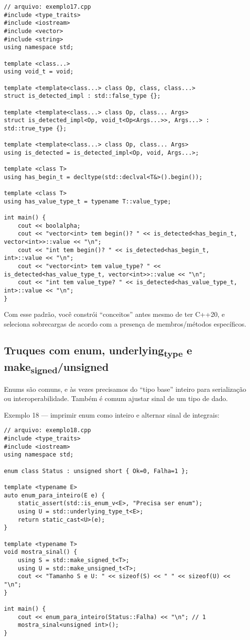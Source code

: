 \documentclass[11pt]{article}
\begin{document}
\begin{verbatim}
// arquivo: exemplo17.cpp
#include <type_traits>
#include <iostream>
#include <vector>
#include <string>
using namespace std;

template <class...>
using void_t = void;

template <template<class...> class Op, class, class...>
struct is_detected_impl : std::false_type {};

template <template<class...> class Op, class... Args>
struct is_detected_impl<Op, void_t<Op<Args...>>, Args...> : std::true_type {};

template <template<class...> class Op, class... Args>
using is_detected = is_detected_impl<Op, void, Args...>;

template <class T>
using has_begin_t = decltype(std::declval<T&>().begin());

template <class T>
using has_value_type_t = typename T::value_type;

int main() {
    cout << boolalpha;
    cout << "vector<int> tem begin()? " << is_detected<has_begin_t, vector<int>>::value << "\n";
    cout << "int tem begin()? " << is_detected<has_begin_t, int>::value << "\n";
    cout << "vector<int> tem value_type? " << is_detected<has_value_type_t, vector<int>>::value << "\n";
    cout << "int tem value_type? " << is_detected<has_value_type_t, int>::value << "\n";
}
\end{verbatim}

Com esse padrão, você constrói “conceitos” antes mesmo de ter C++20, e seleciona sobrecargas de acordo com a presença de membros/métodos específicos.
\subsection{Truques com enum, underlying\textsubscript{type} e make\textsubscript{signed}/unsigned}
\label{sec:org68f8be0}

Enums são comuns, e às vezes precisamos do “tipo base” inteiro para serialização ou interoperabilidade. Também é comum ajustar sinal de um tipo de dado.

Exemplo 18 — imprimir enum como inteiro e alternar sinal de integrais:
\begin{verbatim}
// arquivo: exemplo18.cpp
#include <type_traits>
#include <iostream>
using namespace std;

enum class Status : unsigned short { Ok=0, Falha=1 };

template <typename E>
auto enum_para_inteiro(E e) {
    static_assert(std::is_enum_v<E>, "Precisa ser enum");
    using U = std::underlying_type_t<E>;
    return static_cast<U>(e);
}

template <typename T>
void mostra_sinal() {
    using S = std::make_signed_t<T>;
    using U = std::make_unsigned_t<T>;
    cout << "Tamanho S e U: " << sizeof(S) << " " << sizeof(U) << "\n";
}

int main() {
    cout << enum_para_inteiro(Status::Falha) << "\n"; // 1
    mostra_sinal<unsigned int>();
}
\end{verbatim}
\end{document}
